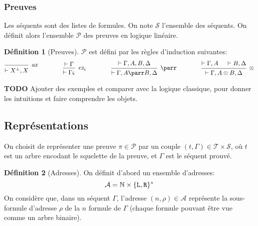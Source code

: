 \documentclass[11pt,a4paper]{article}
\theoremstyle{plain}
\theoremstyle{definition}
\newtheorem{definition}{Définition}
\theoremstyle{remark}
\newcommand*{\orth}{^\perp}
\newcommand*{\tensor}{\otimes}
\newcommand*{\hypv}[1]{\hypo{\vdash #1}}
\newcommand*{\axv}[1]{\infer{0}[\ensuremath{\mathit{ax}}]{\vdash #1}}
\newcommand*{\tensorv}[1]{\infer{2}[\ensuremath{\tensor}]{\vdash #1}}
\newcommand*{\parrv}[1]{\infer{1}[\ensuremath{\parr}]{\vdash #1}}
\newcommand*{\permv}[2]{\infer{1}[\ensuremath{\textit{ex}_{#1}}]{\vdash #2}}
\newcommand*{\permapp}[2]{#2 #1}
\newcommand*{\someperm}{\varsigma}
\newcommand*{\someproof}{\pi}
\newcommand*{\sequent}{\Gamma}
\newcommand*{\Left}{\textnormal{\texttt{L}}}
\newcommand*{\Right}{\textnormal{\texttt{R}}}
\newcommand*{\proofs}{\ensuremath{\mathcal{P}}}
\newcommand*{\sequents}{\ensuremath{\mathcal{S}}}
\newcommand*{\trees}{\ensuremath{\mathcal{T}}}
\newcommand*{\representationslarge}{\ensuremath{\trees \times \sequents}}
\newcommand*{\todo}{{\normalfont \textbf{TODO}} }
\begin{document}
\subsubsection{Preuves}
Les séquents sont des listes de formules. On note $\sequents$ l'ensemble des séquents. On définit alors l'ensemble \proofs{} des preuves en logique linéaire.
\begin{definition}[Preuves]
\proofs{} est défini par les règles d'induction suivantes:
\begin{equation*}
\begin{prooftree}
  \axv{X\orth, X}
\end{prooftree}
\qquad\qquad
\begin{prooftree}
  \hypv{\sequent}
  \permv{\someperm}{\permapp{\someperm}{\sequent}}
\end{prooftree}
\qquad\qquad
\begin{prooftree}
  \hypv{\sequent, A, B, \Delta}
  \parrv{\sequent, A \parr B, \Delta}
\end{prooftree}
\qquad\qquad
\begin{prooftree}
  \hypv{\sequent, A}
  \hypv{B, \Delta}
  \tensorv{\sequent, A \tensor B, \Delta}
\end{prooftree}
\end{equation*}
\end{definition}

\todo{Ajouter des exemples et comparer avec la logique classique, pour donner les intuitions et faire comprendre les objets.}

\subsection{Représentations}
On choisit de représenter une preuve $\someproof \in \mathcal{P}$ par un couple $(t, \sequent) \in \representationslarge$, où $t$ est un arbre encodant le squelette de la preuve, et $\sequent$ est le séquent prouvé.

\begin{definition}[Adresses]
On définit d'abord un ensemble d'adresses:
\begin{equation*}
\mathcal{A} = \mathbb{N} \times \{ \Left, \Right\}^{*}  
\end{equation*}
On considère que, dans un séquent $\sequent$, l'adresse $(n, \rho) \in \mathcal{A}$ représente la sous-formule d'adresse $\rho$ de la $n$\ieme{} formule de $\sequent$ (chaque formule pouvant être vue comme un arbre binaire).
\end{definition}
\end{document}
